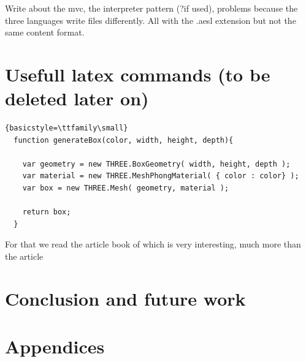 \documentclass{scrartcl}
\begin{document}
Write about the mvc, the interpreter pattern (?if used), problems because the three languages write files differently. All with the .aesl extension but not the same content format.


\section{Usefull latex commands (to be deleted later on)}
\lstset{language=JavaScript}
\begin{lstlisting}{basicstyle=\ttfamily\small}
  function generateBox(color, width, height, depth){

    var geometry = new THREE.BoxGeometry( width, height, depth );
    var material = new THREE.MeshPhongMaterial( { color : color} );
    var box = new THREE.Mesh( geometry, material );
                
    return box;
  }
\end{lstlisting}
For that we read the article book of \cite{Jerald:2015:VBH:2792790}
which is very interesting, much more than the article
\cite{Diniz:2017:UGO:3100317.3100324}

\section{Conclusion and future work}

\section{Appendices}
\end{document}
